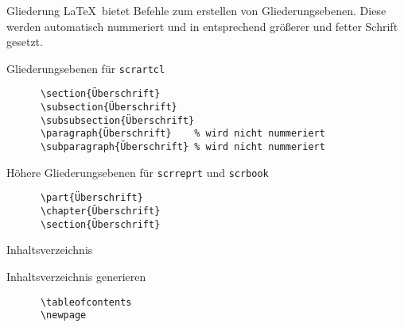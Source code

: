 \begin{frame}[fragile]{Gliederung}
  \LaTeX\ bietet Befehle zum erstellen von Gliederungsebenen.
  Diese werden automatisch nummeriert und in entsprechend größerer und fetter Schrift gesetzt.

  \begin{block}{Gliederungsebenen für \texttt{scrartcl}}
    \begin{lstlisting}
      \section{Überschrift}
      \subsection{Überschrift}
      \subsubsection{Überschrift}
      \paragraph{Überschrift}    % wird nicht nummeriert
      \subparagraph{Überschrift} % wird nicht nummeriert
    \end{lstlisting}
  \end{block}
  \begin{block}{Höhere Gliederungsebenen für \texttt{scrreprt} und \texttt{scrbook}}
    \begin{lstlisting}
      \part{Überschrift}
      \chapter{Überschrift}
      \section{Überschrift}
    \end{lstlisting}
  \end{block}
\end{frame}

\begin{frame}[fragile]{Inhaltsverzeichnis}
  \begin{block}{Inhaltsverzeichnis generieren}
    \begin{lstlisting}
      \tableofcontents
      \newpage
    \end{lstlisting}
  \end{block}
\end{frame}

